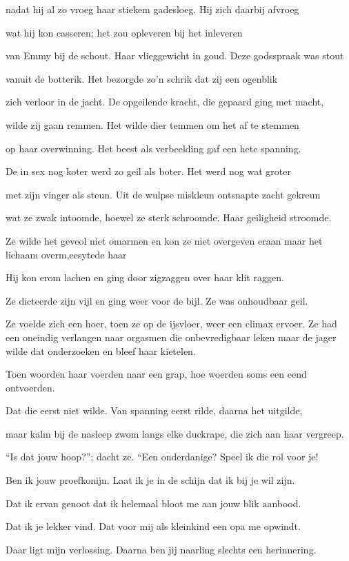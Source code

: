 nadat hij al zo vroeg
haar stiekem gadesloeg.
Hij zich daarbij afvroeg

wat hij kon casseren;
het zou opleveren
bij het inleveren

van Emmy bij de schout.
Haar vlieggewicht in goud.
Deze godsspraak was stout

vanuit de botterik.
Het bezorgde zo’n schrik
dat zij een ogenblik

zich verloor in de jacht.
De opgeilende kracht,
die gepaard ging met macht,

wilde zij gaan remmen.
Het wilde dier temmen
om het af te stemmen

op haar overwinning.
Het beest als verbeelding
gaf een hete spanning.

De in sex nog koter
werd zo geil als boter.
Het werd nog wat groter

met zijn vinger als steun.
Uit de wulpse miskleun
ontsnapte zacht gekreun

wat ze zwak intoomde,
hoewel ze sterk schroomde.
Haar geiligheid stroomde.

Ze wilde het geveol niet omarmen en kon ze niet overgeven eraan maar het lichaam overm,eesytede haar

Hij kon erom lachen
en ging door zigzaggen
over haar klit raggen.

Ze dicteerde zijn vijl
en ging weer voor de bijl.
Ze was onhoudbaar geil.

Ze voelde zich een hoer,
toen ze op de ijsvloer,
weer een climax ervoer.
Ze had een oneindig verlangen naar orgasmen die onbevredigbaar leken maar de jager wilde dat onderzoeken en bleef haar kietelen.

Toen woorden haar voerden
naar een grap, hoe woerden
soms een eend ontvoerden.

Dat die eerst niet wilde.
Van spanning eerst rilde,
daarna het uitgilde,

maar kalm bij de nasleep
zwom langs elke duckrape,
die zich aan haar vergreep.

“Is dat jouw hoop?”; dacht ze.
“Een onderdanige?
Speel ik die rol voor je!

Ben ik jouw proefkonijn.
Laat ik je in de schijn
dat ik bij je wil zijn.

Dat ik ervan genoot
dat ik helemaal bloot
me aan jouw blik aanbood.

Dat ik je lekker vind.
Dat voor mij als kleinkind
een opa me opwindt.

Daar ligt mijn verlossing.
Daarna ben jij naarling
slechts een herinnering.

